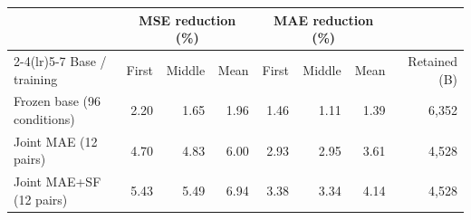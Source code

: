 \begingroup\fontsize{9}{11}\selectfont
\setlength{\tabcolsep}{5pt}
\renewcommand{\arraystretch}{1.18}
\begin{tabular}{@{}lrrrrrrr@{}}
\toprule
& \multicolumn{3}{c}{MSE reduction (\%)} & \multicolumn{3}{c}{MAE reduction (\%)} & \\
\cmidrule(lr){2-4}\cmidrule(lr){5-7}
Base / training & First & Middle & Mean & First & Middle & Mean & Retained (B) \\
\midrule
Frozen base (96 conditions) & 2.20 & 1.65 & 1.96 & 1.46 & 1.11 & 1.39 & 6,352 \\
Joint MAE (12 pairs) & 4.70 & 4.83 & 6.00 & 2.93 & 2.95 & 3.61 & 4,528 \\
Joint MAE+SF (12 pairs) & 5.43 & 5.49 & 6.94 & 3.38 & 3.34 & 4.14 & 4,528 \\
\bottomrule
\end{tabular}
\endgroup
